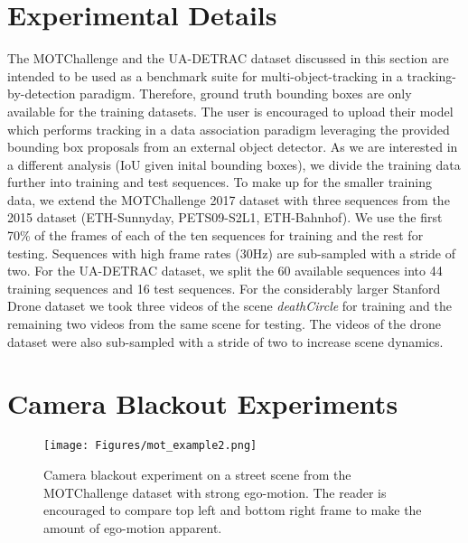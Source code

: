 \section{Experimental Details}
\label{sec:experimental_details}
The MOTChallenge and the UA-DETRAC dataset discussed in this section are intended to be used as a benchmark suite for multi-object-tracking in a tracking-by-detection paradigm. Therefore, ground truth bounding boxes are only available for the training datasets. The user is encouraged to upload their model which performs tracking in a data association paradigm leveraging the provided bounding box proposals from an external object detector. As we are interested in a different analysis (IoU given inital bounding boxes), we divide the training data further into training and test sequences. To make up for the smaller training data, we extend the MOTChallenge 2017 dataset with three sequences from the 2015 dataset (ETH-Sunnyday, PETS09-S2L1, ETH-Bahnhof). We use the first 70\% of the frames of each of the ten sequences for training and the rest for testing. Sequences with high frame rates (30Hz) are sub-sampled with a stride of two. For the UA-DETRAC dataset, we split the 60 available sequences into 44 training sequences and 16 test sequences. For the considerably larger Stanford Drone dataset we took three videos of the scene \textit{deathCircle} for training and the remaining two videos from the same scene for testing. The videos of the drone dataset were also sub-sampled with a stride of two to increase scene dynamics.


\section{Camera Blackout Experiments}
\label{sec:blackout}

\begin{figure}
	\centering
	\texttt{[image: Figures/mot\_example2.png]}
	\vspace{-6mm}
	\caption{Camera blackout experiment on a street scene from the MOTChallenge dataset with strong ego-motion. The reader is encouraged to compare top left and bottom right frame to make the amount of ego-motion apparent.}
	\label{fig:blackout2}
\end{figure}


